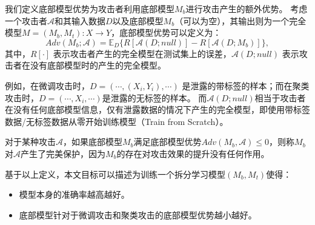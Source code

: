 \begin{definition}[底部模型优势]
    我们定义底部模型优势为攻击者利用底部模型$M_b$进行攻击产生的额外优势。
    考虑一个攻击者$\mathcal A$和其输入数据$D$以及底部模型$M_b$（可以为空），其输出则为一个完全模型$M = (M_b, M_t): X \to Y$，底部模型优势可以定义为：
    \begin{equation}
        Adv(M_b; \mathcal A) = \mathbb E_D \{ R[\mathcal A(D; null)] - R[\mathcal A(D; M_b)]\},
    \end{equation}
    其中，$R[\cdot]$ 表示攻击者产生的完全模型在测试集上的误差，$\mathcal A(D; null)$ 表示攻击者在没有底部模型时的产生的完全模型。
\end{definition}
%
例如，在微调攻击时，$D = (\cdots, (X_i, Y_i), \cdots)$ 是泄露的带标签的样本；而在聚类攻击时，$D = (\cdots, X_i, \cdots)$是泄露的无标签的样本。
%
而$\mathcal A(D; null)$相当于攻击者在没有任何底部模型信息，仅有泄露数据的情况下产生的完全模型，即使用带标签数据/无标签数据从零开始训练模型（Train from Scratch）。

\begin{definition}[完美保护]
    对于某种攻击$\mathcal A$，如果底部模型$M_b$满足底部模型优势$Adv(M_b, \mathcal A) \le 0$，则称$M_b$对$\mathcal A$产生了完美保护，因为$M_b$的存在对攻击效果的提升没有任何作用。
\end{definition}

基于以上定义，本文目标可以描述为训练一个拆分学习模型$(M_b, M_t)$使得：
\begin{itemize}
    \item 模型本身的准确率越高越好。
    \item 底部模型针对于微调攻击和聚类攻击的底部模型优势越小越好。
\end{itemize}